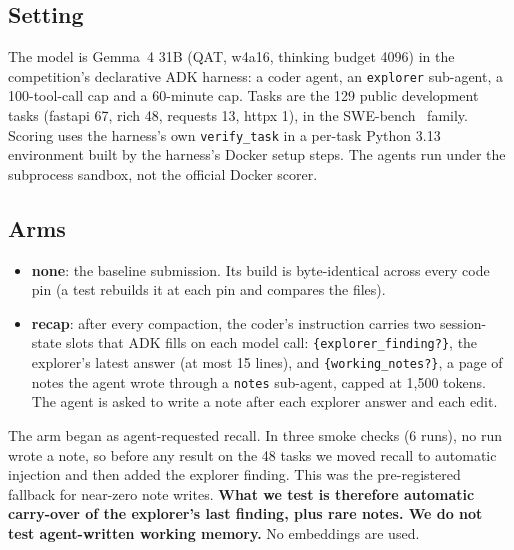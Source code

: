 \documentclass[11pt]{article}
\newcommand{\code}[1]{\texttt{#1}}
\begin{document}
\subsection{Setting}
The model is Gemma~4 31B (QAT, w4a16, thinking budget 4096) in the competition's declarative ADK
harness: a coder agent, an \code{explorer} sub-agent, a 100-tool-call cap and a 60-minute cap. Tasks
are the 129 public development tasks (fastapi 67, rich 48, requests 13, httpx 1), in the
SWE-bench~\citep{jimenez2023swebench} family. Scoring uses the harness's own \code{verify\_task} in
a per-task Python 3.13 environment built by the harness's Docker setup steps. The agents run under
the subprocess sandbox, not the official Docker scorer.

\subsection{Arms}
\begin{itemize}
\item \textbf{none}: the baseline submission. Its build is byte-identical across every code pin
  (a test rebuilds it at each pin and compares the files).
\item \textbf{recap}: after every compaction, the coder's instruction carries two session-state slots
  that ADK fills on each model call: \code{\{explorer\_finding?\}}, the explorer's latest answer (at
  most 15 lines), and \code{\{working\_notes?\}}, a page of notes the agent wrote through a
  \code{notes} sub-agent, capped at 1,500 tokens. The agent is asked to write a note after each
  explorer answer and each edit.
\end{itemize}
The arm began as agent-requested recall. In three smoke checks (6 runs), no run wrote a note, so
before any result on the 48 tasks we moved recall to automatic injection and then added the
explorer finding. This was the pre-registered fallback for near-zero note writes. \textbf{What we
test is therefore automatic carry-over of the explorer's last finding, plus rare notes. We do not
test agent-written working memory.} No embeddings are used.
\end{document}
